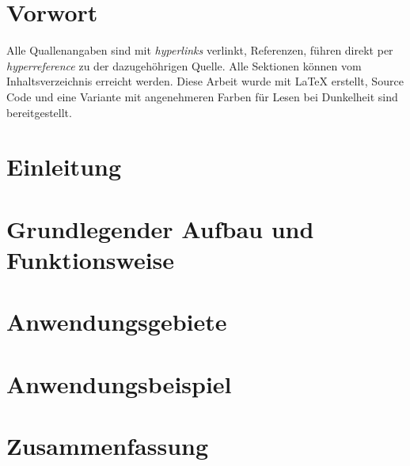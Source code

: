 \documentclass{article}
\begin{document}
    

    \tableofcontents
    \thispagestyle{empty}
    \newpage


    \section{Vorwort}
        Alle Quallenangaben sind mit \textit{hyperlinks} verlinkt,
        Referenzen, führen direkt per \textit{hyperreference} zu der
        dazugehöhrigen Quelle. Alle Sektionen können vom Inhaltsverzeichnis
        erreicht werden. Diese Arbeit wurde mit \LaTeX{} erstellt, Source
        Code und eine Variante mit angenehmeren Farben für Lesen bei
        Dunkelheit sind bereitgestellt.
    \clearpage

    \section{Einleitung}
    

    \section{Grundlegender Aufbau und Funktionsweise}
    

    \section{Anwendungsgebiete}
    

    \section{Anwendungsbeispiel}
    

    \section{Zusammenfassung}

    
\end{document}
